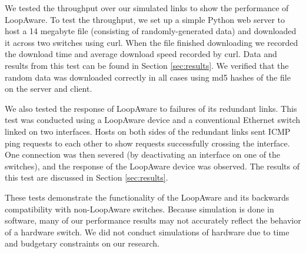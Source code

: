     We tested the throughput over our simulated links to show the performance of LoopAware.
    To test the throughput, we set up a simple Python web server to host a 14 megabyte file (consisting of randomly-generated data) and downloaded it across two switches using curl.
    When the file finished downloading we recorded the download time and average download speed recorded by curl.
    Data and results from this test can be found in Section \ref{sec:results}.
    We verified that the random data was downloaded correctly in all cases using md5 hashes of the file on the server and client.

    We also tested the response of LoopAware to failures of its redundant links.
    This test was conducted using a LoopAware device and a conventional Ethernet switch linked on two interfaces.
    Hosts on both sides of the redundant links sent ICMP ping requests to each other to show requests successfully crossing the
    interface.
    One connection was then severed (by deactivating an interface on one of the switches), and the response of the LoopAware device was observed.
    The results of this test are discussed in Section \ref{sec:results}.

    These tests demonstrate the functionality of the LoopAware and its backwards compatibility with non-LoopAware switches.
    Because simulation is done in software, many of our performance results may not accurately reflect the behavior of a hardware switch.
    We did not conduct simulations of hardware due to time and budgetary constraints on our research.
